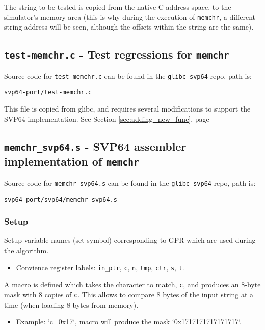 The string to be tested is copied from the native C address space, to the
simulator's memory area (this is why during the execution of \texttt{memchr},
a different string address will be seen, although the offsets within the
string are the same).

\subsection{\texttt{test-memchr.c} - Test regressions for \texttt{memchr}}

Source code for \texttt{test-memchr.c} can be found in the
\texttt{glibc-svp64} repo, path is:
\begin{verbatim}
svp64-port/test-memchr.c
\end{verbatim}

This file is copied from glibc, and requires several modifications to support
the SVP64 implementation. See Section \ref{sec:adding_new_func},
page \pageref{sec:adding_new_func}

\subsection{\texttt{memchr\_svp64.s} - SVP64 assembler implementation of \texttt{memchr}}

Source code for \texttt{memchr\_svp64.s} can be found in the
\texttt{glibc-svp64} repo, path is:
\begin{verbatim}
svp64-port/svp64/memchr_svp64.s
\end{verbatim}

\subsubsection{Setup}

Setup variable names (set symbol) corresponding to \acrfull{GPR} which are used
during the algorithm.

\begin{itemize}
  \item Convience register labels: \texttt{in\_ptr}, \texttt{c}, \texttt{n},
  \texttt{tmp}, \texttt{ctr}, \texttt{s}, \texttt{t}.
\end{itemize}

A macro is defined which takes the character to match, \texttt{c},
and produces an 8-byte mask with 8 copies of \texttt{c}.
This allows to compare 8 bytes of the input string at a time
(when loading 8-bytes from memory).

\begin{itemize}
  \item Example: `c=0x17`, macro will produce the mask `0x1717171717171717`.
\end{itemize}

